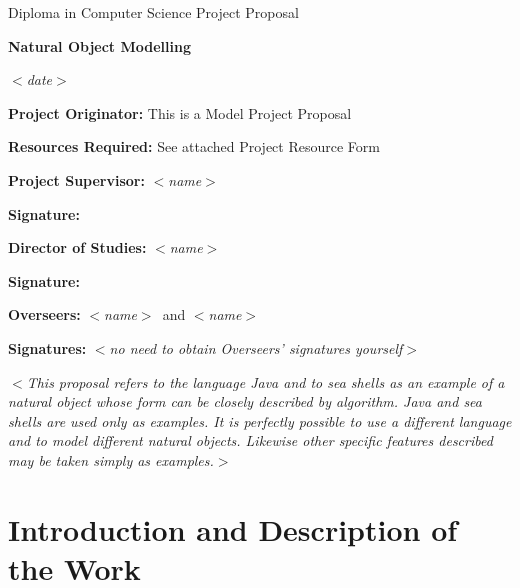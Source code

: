 \documentclass[12pt]{article}
\newcommand{\al}{$<$}
\newcommand{\ar}{$>$}
\begin{document}
\thispagestyle{empty}

\rightline{\large\al\emph{name}\ar}
\medskip
\rightline{\large\al\emph{College}\ar}
\medskip
\rightline{\large\al\emph{CRSID}\ar}

\vfil

\centerline{\large Diploma in Computer Science Project Proposal}
\vspace{0.4in}
\centerline{\Large\bf Natural Object Modelling}
\vspace{0.3in}
\centerline{\large \al\emph{date}\ar}

\vfil

{\bf Project Originator:} This is a Model Project Proposal

\vspace{0.1in}

{\bf Resources Required:} See attached Project Resource Form

\vspace{0.5in}

{\bf Project Supervisor:} \al\emph{name}\ar

\vspace{0.2in}

{\bf Signature:}

\vspace{0.5in}

{\bf Director of Studies:}  \al\emph{name}\ar

\vspace{0.2in}

{\bf Signature:}

\vspace{0.5in}

{\bf Overseers:} \al\emph{name}\ar\ and \al\emph{name}\ar

\vspace{0.2in}

{\bf Signatures:} \al\emph{no need to obtain Overseers' signatures yourself}\ar

\vfil
\eject


\al\emph{This proposal refers to the language Java and to sea
  shells as an example of a natural object whose form can be closely
  described by algorithm.  Java and sea shells are used only as
  examples.  It is perfectly possible to use a different language and
  to model different natural objects.  Likewise other specific
  features described may be taken simply as examples.}\ar


\section*{Introduction and Description of the Work}
\end{document}
